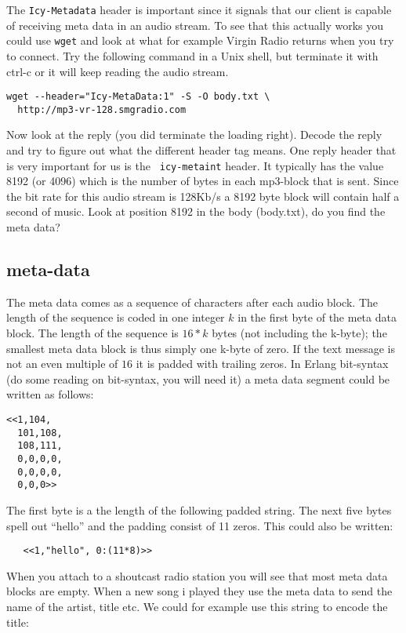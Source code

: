 \documentclass[a4paper,dvips,11pt]{article}
\begin{document}
The {\tt Icy-Metadata} header is important since it signals that our
client is capable of receiving meta data in an audio stream. To see that
this actually works you could use {\tt wget} and look at what for
example Virgin Radio returns when you try to connect. Try the
following command in a Unix shell, but terminate it with ctrl-c or it will
keep reading the audio stream.

\begin{verbatim}
wget --header="Icy-MetaData:1" -S -O body.txt \
  http://mp3-vr-128.smgradio.com
\end{verbatim}

Now look at the reply (you did terminate the loading right). Decode
the reply and try to figure out what the different header tag
means. One reply header that is very important for us is the {\tt
  icy-metaint} header. It typically has the value 8192 (or 4096) which
is the number of bytes in each mp3-block that is sent. Since the bit
rate for this audio stream is 128Kb/s a 8192 byte block will contain
half a second of music. Look at position 8192 in the body (body.txt),
do you find the meta data?


\subsection{meta-data}

The meta data comes as a sequence of characters after each audio
block. The length of the sequence is coded in one integer $k$ in the
first byte of the meta data block. The length of the sequence is
$16*k$ bytes (not including the k-byte); the smallest meta data block
is thus simply one k-byte of zero. If the text message is not an even
multiple of $16$ it is padded with trailing zeros. In Erlang
bit-syntax (do some reading on bit-syntax, you will need it) a meta
data segment could be written as follows:

\begin{verbatim}
<<1,104,
  101,108,
  108,111,
  0,0,0,0,
  0,0,0,0,
  0,0,0>>
\end{verbatim}

The first byte is a the length of the following padded string. The
next five bytes spell out ``hello'' and the padding consist of 11
zeros. This could also be written:

\begin{verbatim}
   <<1,"hello", 0:(11*8)>>
\end{verbatim}

When you attach to a shoutcast radio station you will see that most
meta data blocks are empty. When a new song i played they use the meta
data to send the name of the artist, title etc. We could for example
use this string to encode the title:
\end{document}
